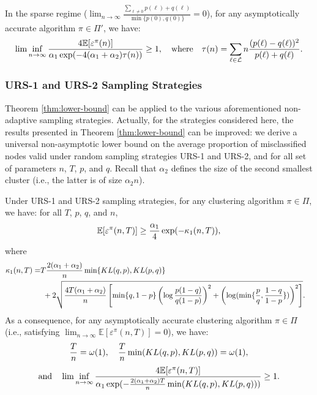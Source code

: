 \documentclass[12pt]{colt}%
\begin{document}
\begin{theorem}
In the sparse regime ($\lim_{n\to \infty}\frac{\sum_{\ell\neq 0}p(\ell)+q(\ell)}{\min\{p(0),q(0)\}}=0$), for any asymptotically accurate algorithm $\pi\in \Pi'$, we have:
$$\lim\inf_{n \rightarrow \infty} {4\mathbb{E}[\varepsilon^\pi(n)]\over \alpha_1\exp(-4(\alpha_1 + \alpha_2)\tau(n))} \ge 1 ,\quad \mbox{where}\quad \tau(n) = \sum_{\ell \in {\cal L} } n\frac{(p(\ell)-q(\ell))^2}{p(\ell)+q(\ell)} .$$

\label{thm:lower-bound}
\end{theorem}


\subsubsection{URS-1 and URS-2 Sampling Strategies}

Theorem \ref{thm:lower-bound} can be applied to the various aforementioned non-adaptive sampling strategies. Actually, for the strategies considered here, the results presented in Theorem \ref{thm:lower-bound} can be improved: we derive a universal non-asymptotic lower bound on the average proportion of misclassified nodes valid under random sampling strategies URS-1 and URS-2, and for all set of parameters $n$, $T$, $p$, and $q$. Recall that $\alpha_2$ defines the size of the second smallest cluster (i.e., the latter is of size $\alpha_2 n$). 

\begin{theorem}\label{thm:l1}
Under URS-1 and URS-2 sampling strategies, for any clustering algorithm $\pi\in\Pi$, we have: for all $T$, $p$, $q$, and $n$,
\begin{equation}\label{eq:nonas}
{\mathbb{E}[\varepsilon^\pi(n,T)]\ge {\alpha_1 \over 4} \exp(-\kappa_1(n,T))},
\end{equation}
where
\begin{align*}
\kappa_1(n,T)=& T{2(\alpha_1+\alpha_2)\over n} \min \{ KL(q,p), KL(p,q)\}  \cr & ~+2\sqrt{\frac{4T(\alpha_1 + \alpha_2)}{n}\left[\min\{q,1-p\} \left(
    \log\frac{p(1-q)}{q(1-p)}\right)^2  + \left(
    \log(\min\{\frac{p}{q},\frac{1-q}{1-p} \})\right)^2 \right]}.
\end{align*}
As a consequence, for any asymptotically accurate clustering algorithm $\pi\in\Pi$ (i.e., satisfying $\lim_{n\to\infty} \mathbb{E}[\varepsilon^\pi(n,T)]=0$), we have:
\begin{equation}\label{eq:univ2}
{T\over n}=\omega(1),\quad {T\over n}\min(KL(q,p),KL(p,q))=\omega(1),
\end{equation}
\begin{equation}\label{eq:univ}
\hbox{and}\quad \lim\inf_{n\to\infty} {4\mathbb{E}[\varepsilon^\pi(n,T)]\over \alpha_1 \exp(-{2(\alpha_1 + \alpha_2)T\over n}\min(KL(q,p),KL(p,q)))}\ge 1.
\end{equation}
\end{theorem}
\end{document}
